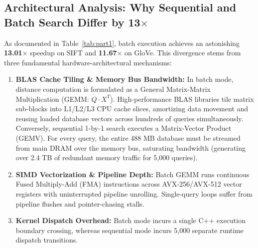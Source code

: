 \documentclass[11pt,a4paper]{article}
\begin{document}
\begin{table}[htbp]
\centering
\small
\caption{Exact Search Baseline Performance (Single Thread, Median of 3 Trials)}
\label{tab:part1}
\end{table}

\subsection{Architectural Analysis: Why Sequential and Batch Search Differ by \texorpdfstring{13$\times$}{13x}}
As documented in Table~\ref{tab:part1}, batch execution achieves an astonishing \textbf{13.01$\times$} speedup on SIFT and \textbf{11.67$\times$} on GloVe. This divergence stems from three fundamental hardware-architectural mechanisms:
\begin{enumerate}
    \item \textbf{BLAS Cache Tiling \& Memory Bus Bandwidth:} In batch mode, distance computation is formulated as a General Matrix-Matrix Multiplication (GEMM: $Q \cdot X^T$). High-performance BLAS libraries tile matrix sub-blocks into L1/L2/L3 CPU cache slices, amortizing data movement and reusing loaded database vectors across hundreds of queries simultaneously. Conversely, sequential 1-by-1 search executes a Matrix-Vector Product (GEMV). For every query, the entire 488 MB database must be streamed from main DRAM over the memory bus, saturating bandwidth (generating over 2.4 TB of redundant memory traffic for 5,000 queries).
    \item \textbf{SIMD Vectorization \& Pipeline Depth:} Batch GEMM runs continuous Fused Multiply-Add (FMA) instructions across AVX-256/AVX-512 vector registers with uninterrupted pipeline unrolling. Single-query loops suffer from pipeline flushes and pointer-chasing stalls.
    \item \textbf{Kernel Dispatch Overhead:} Batch mode incurs a single C++ execution boundary crossing, whereas sequential mode incurs 5,000 separate runtime dispatch transitions.
\end{enumerate}
\end{document}
